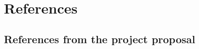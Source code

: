 \section*{References}

\subsection*{References from the project proposal}
\begingroup
\renewcommand{\section}[2]{}%
\small
